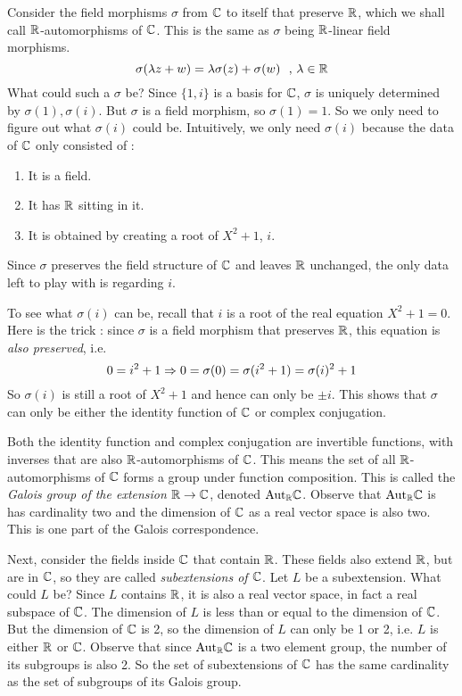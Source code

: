 \documentclass[../book.tex]{subfiles}
\begin{document}
Consider the field morphisms $\sigma$ from $\mathbb{C}$ to itself that preserve $\mathbb{R}$,
which we shall call $\mathbb{R}$-automorphisms of $\mathbb{C}$. 
This is the same as $\sigma$ being $\mathbb{R}$-linear field morphisms.\[
    \sigma(\lambda z + w) = \lambda \sigma(z) + \sigma(w) \,\,\,\,,\, \lambda \in \mathbb{R}
\]
What could such a $\sigma$ be? 
Since $\{1,i\}$ is a basis for $\mathbb{C}$, 
$\sigma$ is uniquely determined by $\sigma(1), \sigma(i)$.
But $\sigma$ is a field morphism, so $\sigma(1) = 1$. 
So we only need to figure out what $\sigma(i)$ could be. 
Intuitively, we only need $\sigma(i)$ because 
the data of $\mathbb{C}$ only consisted of : \begin{enumerate}
    \item It is a field.
    \item It has $\mathbb{R}$ sitting in it.
    \item It is obtained by creating a root of $X^2 + 1$, $i$.
\end{enumerate}
Since $\sigma$ preserves the field structure of $\mathbb{C}$ and leaves $\mathbb{R}$ unchanged,
the only data left to play with is regarding $i$. 

To see what $\sigma(i)$ can be, recall that 
$i$ is a root of the real equation $X^2 + 1 = 0$.
Here is the trick : 
since $\sigma$ is a field morphism that preserves $\mathbb{R}$, 
this equation is \emph{also preserved},
i.e. \[
    0 = i^2 + 1 \Rightarrow 
    0 = \sigma(0) = \sigma(i^2 + 1) = \sigma(i)^2 + 1
\]
So $\sigma(i)$ is still a root of $X^2 + 1$
and hence can only be $\pm i$. 
This shows that $\sigma$ can only be either the identity function of $\mathbb{C}$
or complex conjugation. 

Both the identity function and complex conjugation are invertible functions,
with inverses that are also $\mathbb{R}$-automorphisms of $\mathbb{C}$. 
This means the set of all $\mathbb{R}$-automorphisms of $\mathbb{C}$ forms a group
under function composition. 
This is called the \emph{Galois group of the extension $\mathbb{R} \to \mathbb{C}$},
denoted $\mathrm{Aut}_{\mathbb{R}}\mathbb{C}$.
Observe that $\mathrm{Aut}_{\mathbb{R}}\mathbb{C}$ is has cardinality two
and the dimension of $\mathbb{C}$ as a real vector space is also two.
This is one part of the Galois correspondence.

Next, consider the fields inside $\mathbb{C}$ that contain $\mathbb{R}$.
These fields also extend $\mathbb{R}$, but are in $\mathbb{C}$, 
so they are called \emph{subextensions of $\mathbb{C}$}.
Let $L$ be a subextension. What could $L$ be?
Since $L$ contains $\mathbb{R}$, it is also a real vector space,
in fact a real subspace of $\mathbb{C}$. 
The dimension of $L$ is less than or equal to the dimension of $\mathbb{C}$. 
But the dimension of $\mathbb{C}$ is 2, so the dimension of $L$ can only be 1 or 2,
i.e. $L$ is either $\mathbb{R}$ or $\mathbb{C}$.
Observe that since $\mathrm{Aut}_{\mathbb{R}}\mathbb{C}$ is a two element group, 
the number of its subgroups is also 2. 
So the set of subextensions of $\mathbb{C}$ has the same cardinality as 
the set of subgroups of its Galois group.
\end{document}
